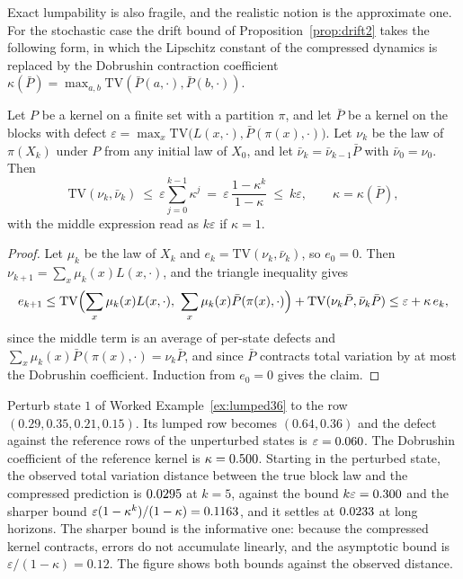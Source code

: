 Exact lumpability is also fragile, and the realistic notion is the approximate one. For the stochastic case the drift bound of Proposition~\ref{prop:drift2} takes the following form, in which the Lipschitz constant of the compressed dynamics is replaced by the Dobrushin contraction coefficient $\kappa(\bar P)=\max_{a,b}\mathrm{TV}(\bar P(a,\cdot),\bar P(b,\cdot))$.

\begin{extension}\label{ext:lumpdrift}
Let $P$ be a kernel on a finite set with a partition $\pi$, and let $\bar P$ be a kernel on the blocks with defect $\varepsilon=\max_x\mathrm{TV}\bigl(L(x,\cdot),\bar P(\pi(x),\cdot)\bigr)$. Let $\nu_k$ be the law of $\pi(X_k)$ under $P$ from any initial law of $X_0$, and let $\bar\nu_k=\bar\nu_{k-1}\bar P$ with $\bar\nu_0=\nu_0$. Then
\begin{equation}
\mathrm{TV}(\nu_k,\bar\nu_k)\ \le\ \varepsilon\sum_{j=0}^{k-1}\kappa^j\ =\ \varepsilon\,\frac{1-\kappa^k}{1-\kappa}\ \le\ k\varepsilon,\qquad \kappa=\kappa(\bar P),
\end{equation}
with the middle expression read as $k\varepsilon$ if $\kappa=1$.
\end{extension}

\begin{proof}
Let $\mu_k$ be the law of $X_k$ and $e_k=\mathrm{TV}(\nu_k,\bar\nu_k)$, so $e_0=0$. Then $\nu_{k+1}=\sum_x\mu_k(x)L(x,\cdot)$, and the triangle inequality gives
\begin{equation}
e_{k+1}\le\mathrm{TV}\Bigl(\sum_x\mu_k(x)L(x,\cdot),\ \sum_x\mu_k(x)\bar P(\pi(x),\cdot)\Bigr)+\mathrm{TV}(\nu_k\bar P,\bar\nu_k\bar P)\le\varepsilon+\kappa\,e_k,
\end{equation}
since the middle term is an average of per-state defects and $\sum_x\mu_k(x)\bar P(\pi(x),\cdot)=\nu_k\bar P$, and since $\bar P$ contracts total variation by at most the Dobrushin coefficient. Induction from $e_0=0$ gives the claim.
\end{proof}

\begin{workedex}\label{ex:drift36}
Perturb state $1$ of Worked Example~\ref{ex:lumped36} to the row $(0.29,0.35,0.21,0.15)$. Its lumped row becomes $(0.64,0.36)$ and the defect against the reference rows of the unperturbed states is $\varepsilon=0.060$. The Dobrushin coefficient of the reference kernel is $\kappa=0.500$. Starting in the perturbed state, the observed total variation distance between the true block law and the compressed prediction is $0.0295$ at $k=5$, against the bound $k\varepsilon=0.300$ and the sharper bound $\varepsilon(1-\kappa^k)/(1-\kappa)=0.1163$, and it settles at $0.0233$ at long horizons. The sharper bound is the informative one: because the compressed kernel contracts, errors do not accumulate linearly, and the asymptotic bound is $\varepsilon/(1-\kappa)=0.12$. The figure shows both bounds against the observed distance.
\end{workedex}


